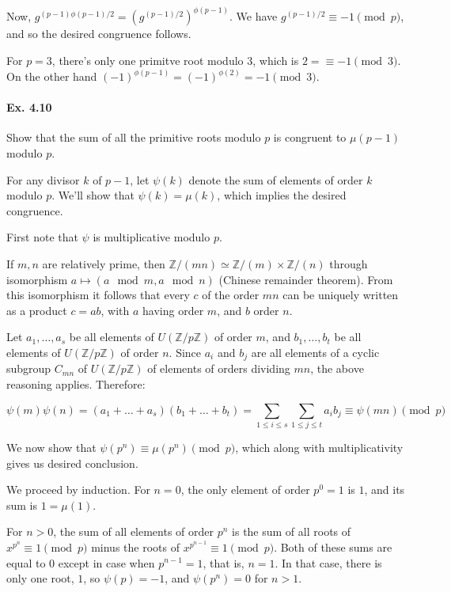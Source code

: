 \documentclass[notitlepage]{article}
\theoremstyle{definition}
\newcommand\Z{\mathbb{Z}}
\begin{document}
Now, $g^{(p-1)\phi(p-1)/2} = (g^{(p-1)/2})^{\phi(p-1)}$. We have
$g^{(p-1)/2} \equiv -1 \pmod p$, and so the desired congruence
follows.

For $p=3$, there's only one primitve root modulo $3$, which is $2 =
\equiv -1 \pmod 3$. On the other hand $(-1)^{\phi(p-1)} =
(-1)^{\phi(2)} = -1 \pmod 3$.

\paragraph{Ex. 4.10}
Show that the sum of all the primitive roots modulo $p$ is
congruent to $\mu(p-1)$ modulo $p$.

For any divisor $k$ of $p-1$, let $\psi(k)$ denote the sum of elements
of order $k$ modulo $p$. We'll show that $\psi(k) = \mu(k)$, which
implies the desired congruence.

First note that $\psi$ is multiplicative modulo $p$.

If $m, n$ are relatively prime, then $\Z/(mn) \simeq \Z/(m) \times
\Z/(n)$ through isomorphism $a \mapsto (a \mod m, a \mod n)$ (Chinese
remainder theorem).  From this isomorphism it follows that every $c$
of the order $mn$ can be uniquely written as a product $c = ab$, with
$a$ having order $m$, and $b$ order $n$.

Let $a_1, \ldots, a_s$ be all elements of $U(\Z/p\Z)$ of order $m$,
and $b_1, \ldots, b_t$ be all elements of $U(\Z/p\Z)$ of order
$n$. Since $a_i$ and $b_j$ are all elements of a cyclic subgroup
$C_{mn}$ of $U(\Z/p\Z)$ of elements of orders dividing $mn$, the above
reasoning applies. Therefore:

\begin{equation}
  \psi(m)\psi(n) = (a_1 + \ldots + a_s)(b_1 + \ldots + b_t) = \sum_{1
    \leq i \leq s} \sum_{1 \leq j \leq t} a_i b_j \equiv \psi(mn) \pmod p
\end{equation}

We now show that $\psi(p^n) \equiv \mu(p^n) \pmod p$, which along with
multiplicativity gives us desired conclusion.

We proceed by induction. For $n = 0$, the only element of order $p^0 =
1$ is $1$, and its sum is $1 = \mu(1)$.

For $n > 0$, the sum of all elements of order $p^n$ is the sum of all
roots of $x^{p^n} \equiv 1 \pmod p$ minus the roots of $x^{p^{n-1}}
\equiv 1 \pmod p$. Both of these sums are equal to $0$ except in case
when $p^{n-1} = 1$, that is, $n = 1$. In that case, there is only one
root, $1$, so $\psi(p) = -1$, and $\psi(p^n) = 0$ for $n>1$.
\end{document}
